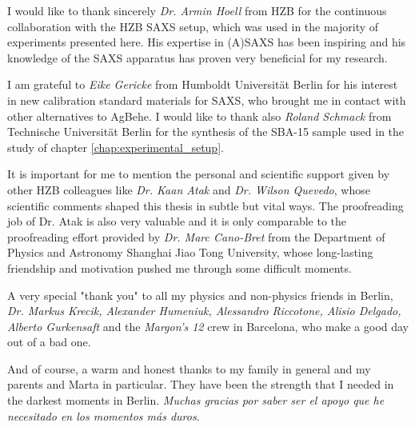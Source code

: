 \noindent I would like to thank sincerely \emph{Dr. Armin Hoell} from HZB for the continuous collaboration with the HZB SAXS setup, which was used in the majority of experiments presented here. His expertise in (A)SAXS has been inspiring and his knowledge of the SAXS apparatus has proven very beneficial for my research.
\vspace{2ex}

\noindent I am grateful to \emph{Eike Gericke} from Humboldt Universität Berlin for his interest in new calibration standard materials for SAXS, who brought me in contact with other alternatives to AgBehe. I would like to thank also \emph{Roland Schmack} from Technische Universität Berlin for the synthesis of the SBA-15 sample used in the study of chapter \ref{chap:experimental_setup}.
\vspace{2ex}

\noindent It is important for me to mention the personal and scientific support given by other HZB colleagues like \emph{Dr. Kaan Atak} and \emph{Dr. Wilson Quevedo}, whose scientific comments shaped this thesis in subtle but vital ways. The proofreading job of Dr. Atak is also very valuable and it is only comparable to the proofreading effort provided by \emph{Dr. Marc Cano-Bret} from the Department of Physics and Astronomy Shanghai Jiao Tong University, whose long-lasting friendship and motivation pushed me through some difficult moments.
\vspace{2ex}

\noindent A very special "thank you" to all my physics and non-physics friends in Berlin, \emph{Dr. Markus Krecik, Alexander Humeniuk, Alessandro Riccotone, Alisio Delgado, Alberto Gurkensaft} and the \emph{Margon's 12} crew in Barcelona, who make a good day out of a bad one.
\vspace{2ex}

\noindent And of course, a warm and honest thanks to my family in general and my parents and Marta in particular. They have been the strength that I needed in the darkest moments in Berlin. \emph{Muchas gracias por saber ser el apoyo que he necesitado en los momentos m\'{a}s duros}.

\cleardoublepage
